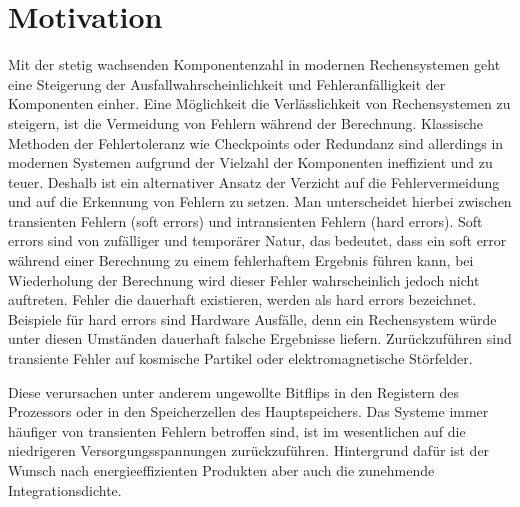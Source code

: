 
\chapter {Motivation}

Mit der stetig wachsenden Komponentenzahl in modernen Rechensystemen geht eine
Steigerung der Ausfallwahrscheinlichkeit und Fehleranfälligkeit der Komponenten einher.
Eine Möglichkeit die Verlässlichkeit von Rechensystemen zu steigern, ist die Vermeidung von
Fehlern während der Berechnung. Klassische Methoden der Fehlertoleranz wie Checkpoints oder
Redundanz sind allerdings in modernen Systemen aufgrund der Vielzahl der Komponenten
ineffizient und zu teuer. Deshalb ist ein alternativer Ansatz der Verzicht auf die Fehlervermeidung
und auf die Erkennung von Fehlern zu setzen.
Man unterscheidet hierbei zwischen transienten Fehlern (soft errors) und intransienten Fehlern
(hard errors). Soft errors sind von zufälliger und temporärer Natur, das bedeutet, dass ein soft
error während einer Berechnung zu einem fehlerhaftem Ergebnis führen kann, bei Wiederholung
der Berechnung wird dieser Fehler wahrscheinlich jedoch nicht auftreten.
Fehler die dauerhaft existieren, werden als hard errors bezeichnet. Beispiele für hard errors sind
Hardware Ausfälle, denn ein Rechensystem würde unter diesen Umständen dauerhaft falsche
Ergebnisse liefern.
Zurückzuführen sind transiente Fehler auf kosmische Partikel oder elektromagnetische Störfelder.



Diese verursachen unter anderem ungewollte Bitflips in den Registern des Prozessors oder in den Speicherzellen des Hauptspeichers. Das Systeme immer häufiger von transienten Fehlern betroffen sind, ist im wesentlichen auf die niedrigeren Versorgungsspannungen zurückzuführen.
Hintergrund dafür ist der Wunsch nach energieeffizienten Produkten aber auch die zunehmende Integrationsdichte.

